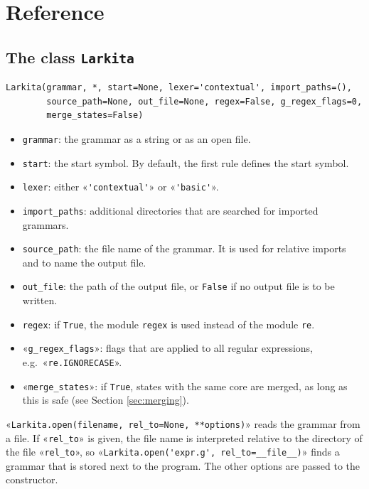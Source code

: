 \documentclass[11pt,a4paper]{article}
\newenvironment{unbreakable}{\par\noindent\begin{minipage}{\linewidth}}{\end{minipage}\par}
\begin{document}
\section{Reference}
\subsection{The class \texttt{Larkita}}
\begin{unbreakable}
\begin{verbatim}
Larkita(grammar, *, start=None, lexer='contextual', import_paths=(),
        source_path=None, out_file=None, regex=False, g_regex_flags=0,
        merge_states=False)
\end{verbatim}
\end{unbreakable}
\begin{itemize}
\item \texttt{grammar}: the grammar as a string or as an open file.
\item \texttt{start}: the start symbol.  By default, the first rule defines the start symbol.
\item \texttt{lexer}: either «\verb|'contextual'|» or «\verb|'basic'|».
\item \texttt{import\_paths}: additional directories that are searched for imported grammars.
\item \texttt{source\_path}: the file name of the grammar.  It is used for relative imports and to name the
      output file.
\item \texttt{out\_file}: the path of the output file, or \texttt{False} if no output file is to be
      written.
\item \texttt{regex}: if \texttt{True}, the module \texttt{regex} is used instead of the module \texttt{re}.
\item «\verb|g_regex_flags|»: flags that are applied to all regular expressions, e.g.~«\verb|re.IGNORECASE|».
\item «\verb|merge_states|»: if \texttt{True}, states with the same core are merged, as long as this is safe
      (see Section \ref{sec:merging}).
\end{itemize}
«\verb|Larkita.open(filename, rel_to=None, **options)|» reads the grammar from a file.  If «\verb|rel_to|» is
given, the file name is interpreted relative to the directory of the file «\verb|rel_to|», so
«\verb|Larkita.open('expr.g', rel_to=__file__)|» finds a grammar that is stored next to the program.  The other
options are passed to the constructor.
\end{document}

